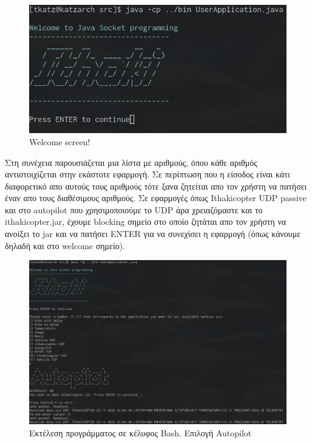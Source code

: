 \documentclass[hidelinks, 12pt, a4paper]{article}
\begin{document}
\begin{figure}[h!]
\centering
	\includegraphics[height=.3\textheight, width=\textwidth]{assets/ui_welcome.png}
	\caption{Welcome screen!} 
    \label{fig:ui}
\end{figure}


Στη συνέχεια παρουσιάζεται μια λίστα με αριθμούς, όπου κάθε αριθμός αντιστοιχίζεται στην εκάστοτε εφαρμογή. Σε περίπτωση που η είσοδος είναι κάτι διαφορετικό απο αυτούς τους αριθμούς τότε ξανα ζητείται απο τον χρήστη να πατήσει έναν απο τους διαθέσιμους αριθμούς. Σε εφαρμογές όπως Ithakicopter UDP passive και στο autopilot που χρησιμοποιούμε το UDP άρα χρειαζόμαστε και το ithakicopter.jar, έχουμε blocking σημείο στο οποίο ζητάται απο τον χρήστη να ανοίξει το jar και να πατήσει ENTER για να συνεχίσει η εφαρμογή (όπως κάνουμε δηλαδή και στο welcome σημείο).

\begin{figure}[h!]
\centering
	\includegraphics[height=.3\textheight, width=\textwidth]{assets/ui.png}
	\caption{Εκτέλεση προγράμματος σε κέλυφος Bash. Επιλογή Autopilot} 
    \label{fig:ui}
\end{figure}
\end{document}
